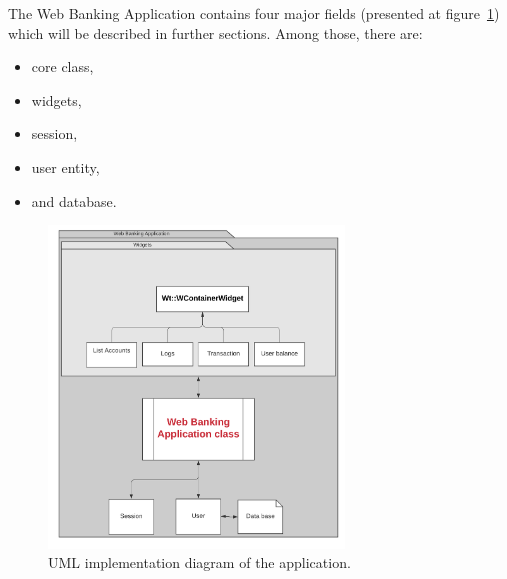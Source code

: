 \documentclass[a4paper,12pt]{book}
\begin{document}
The Web Banking Application contains four major fields (presented at figure~\ref{fig:uml}) which will be described in further sections. Among those, there are:
  
\begin{itemize}
\setlength\itemsep{0em}
\item core class,
\item widgets,
\item session,
\item user entity,
\item and database.
\end{itemize}

\begin{figure}[H]
\centering
\includegraphics[width=0.7\textwidth]{uml2}
\caption{UML implementation diagram of the application.}
\label{fig:uml}
\end{figure}
\end{document}
